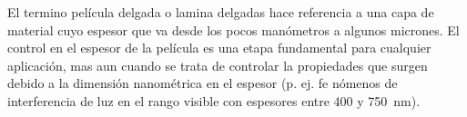 



				

	El termino película delgada o lamina delgadas hace referencia a una capa de material cuyo espesor que va desde los pocos manómetros a algunos micrones. El control en el espesor de la película es una etapa fundamental para cualquier aplicación, mas aun cuando se trata de controlar la propiedades que surgen debido a la dimensión nanométrica en el espesor (p. ej. fe nómenos de interferencia de luz en el rango visible con espesores entre 400 y \SI{750}{\nm}). %


